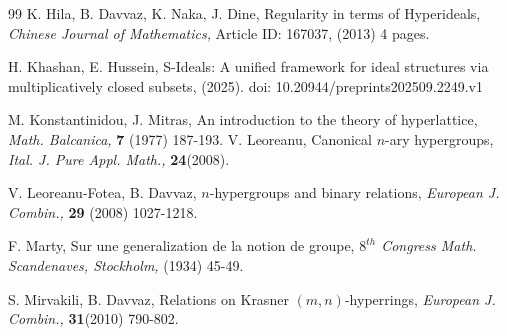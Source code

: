 \documentclass[preprint,review,10pt]{amsart}
\theoremstyle{definition}
\theoremstyle{remark}
\numberwithin{equation}{section}
\begin{document}
\begin{thebibliography}{99}
K. Hila, B. Davvaz, K. Naka, J. Dine, Regularity in terms of Hyperideals, {\it Chinese Journal of Mathematics,}  Article ID: 167037, (2013) 4 pages.

H. Khashan, E. Hussein, S-Ideals: A unified framework for ideal structures via multiplicatively closed subsets, (2025).  doi: 10.20944/preprints202509.2249.v1

M. Konstantinidou, J. Mitras, An introduction to the theory of
hyperlattice, {\it Math. Balcanica,} {\bf 7} (1977) 187-193.
V. Leoreanu, Canonical $n$-ary hypergroups, {\it Ital. J. Pure Appl. Math.,} {\bf 24}(2008).

V. Leoreanu-Fotea, B. Davvaz, $n$-hypergroups and binary relations, {\it European J. Combin.,} {\bf 29} (2008) 1027-1218.





F. Marty, Sur une generalization de la notion de groupe, {\it $8^{th}$ Congress Math. Scandenaves, Stockholm,} (1934) 45-49.



S. Mirvakili, B. Davvaz, Relations on Krasner $(m,n)$-hyperrings, {\it European J. Combin.,} {\bf 31}(2010) 790-802.






\end{thebibliography}
\end{document}
